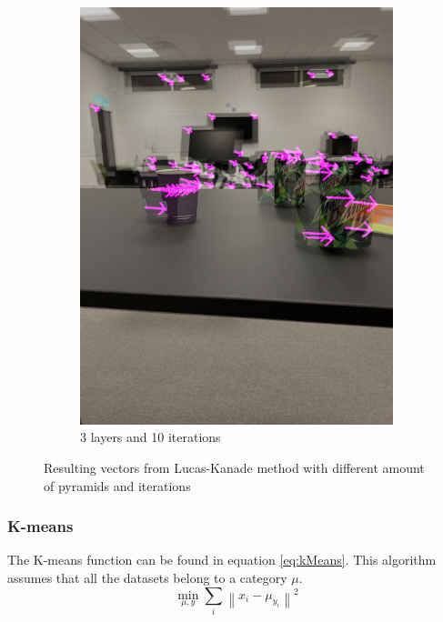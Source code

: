 \documentclass{article}
\newcommand\norm[1]{\left\lVert#1\right\rVert}
\begin{document}
\begin{figure}[H]
\begin{subfigure}{0.48\textwidth}
            \includegraphics[width=1\textwidth]{3levels-10iterations.png}
            \caption{3 layers and 10 iterations}
            \label{fig:sub:flow}
        \end{subfigure}   
        \caption{Resulting vectors from Lucas-Kanade method with different amount of pyramids and iterations}
        \label{fig:flow-vectors}
    \end{figure}

    \subsubsection{K-means}
    The K-means function can be found in equation \ref{eq:kMeans}. This algorithm assumes that all the datasets belong to a category $\mu$.
    \begin{equation}
        \label{eq:kMeans}
        \min_{\mu, y} \sum_i \norm{x_i - \mu_{y_i}}^2
    \end{equation}
\end{document}
